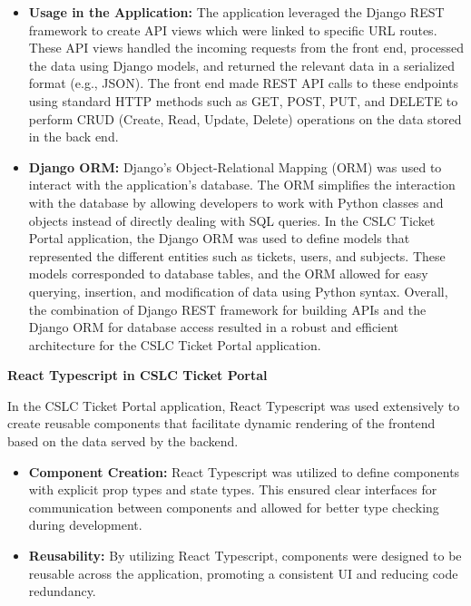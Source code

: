 \documentclass[oneside,openany,obeyspaces]{book}
\begin{document}
\begin{flushleft}
    \begin{itemize}
        \item \textbf{Usage in the Application:}
              The application leveraged the Django REST framework to create API views which were linked to specific URL routes. These API views handled the incoming requests from the front end, processed the data using Django models, and returned the relevant data in a serialized format (e.g., JSON).
              The front end made REST API calls to these endpoints using standard HTTP methods such as GET, POST, PUT, and DELETE to perform CRUD (Create, Read, Update, Delete) operations on the data stored in the back end.

        \item \textbf{Django ORM:}
              Django's Object-Relational Mapping (ORM) was used to interact with the application's database. The ORM simplifies the interaction with the database by allowing developers to work with Python classes and objects instead of directly dealing with SQL queries.
              In the CSLC Ticket Portal application, the Django ORM was used to define models that represented the different entities such as tickets, users, and subjects. These models corresponded to database tables, and the ORM allowed for easy querying, insertion, and modification of data using Python syntax.
              Overall, the combination of Django REST framework for building APIs and the Django ORM for database access resulted in a robust and efficient architecture for the CSLC Ticket Portal application.
    \end{itemize}

    \textbf{React Typescript in CSLC Ticket Portal}

    In the CSLC Ticket Portal application, React Typescript was used extensively to create reusable components that facilitate dynamic rendering of the frontend based on the data served by the backend.

    \begin{itemize}
        \item \textbf{Component Creation:} React Typescript was utilized to define components with explicit prop types and state types. This ensured clear interfaces for communication between components and allowed for better type checking during development.

        \item \textbf{Reusability:} By utilizing React Typescript, components were designed to be reusable across the application, promoting a consistent UI and reducing code redundancy.


\end{itemize}
\end{flushleft}
\end{document}
